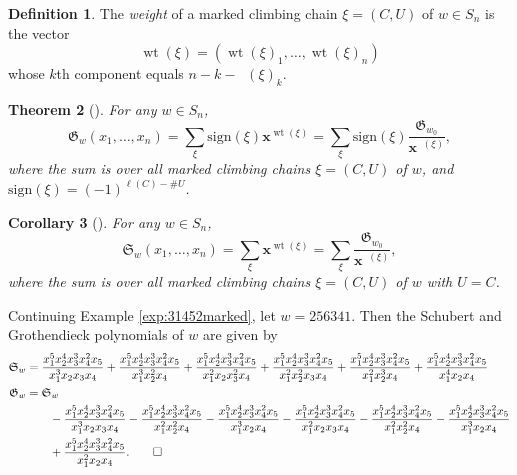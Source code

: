 \documentclass[11pt]{amsart}
\newtheorem{theorem}{Theorem}[section]
\newtheorem{corollary}[theorem]{Corollary}
\theoremstyle{definition}
\newtheorem{definition}[theorem]{Definition}
\newenvironment{example}
{\pushQED{\qed}\renewcommand{\qedsymbol}{$\diamondsuit$}\examplex}
{\popQED\endexamplex}
\theoremstyle{named}
\DeclareMathOperator{\wt}{\mathrm{wt}}
\DeclareMathOperator{\dwt}{\overline{\mathrm{wt}}}
\begin{document}
	\begin{definition}
		The \emph{weight} of a marked climbing chain $\xi=(C,U)$ of $w\in S_n$ is the vector \[\wt(\xi)=(\wt(\xi)_1,\ldots,\wt(\xi)_n)\] whose $k$th component equals $n-k-\dwt(\xi)_k$.
	\end{definition}
	
	\begin{theorem}[{\cite[Theorem 5.6]{LRS}}]
		\label{thm:grothformula}
		For any $w\in S_n$,
		\[\mathfrak{G}_w(x_1,\ldots,x_n) = \sum_{\xi} \mathrm{sign}(\xi) \bm{x}^{\wt(\xi)} =\sum_{\xi} \mathrm{sign}(\xi) \frac{\mathfrak{G}_{w_0}}{\bm{x}^{\dwt(\xi)}}, \]
		where the sum is over all marked climbing chains $\xi=(C,U)$ of $w$, and $\mathrm{sign}(\xi) = (-1)^{\ell(C)-\#U}$.
	\end{theorem}
	
	\begin{corollary}[\cite{LRS}]
		For any $w\in S_n$,
		\[\mathfrak{S}_w(x_1,\ldots,x_n) = \sum_{\xi} \bm{x}^{\wt(\xi)} = \sum_{\xi} \frac{\mathfrak{G}_{w_0}}{\bm{x}^{\dwt(\xi)}}, \]
		where the sum is over all marked climbing chains $\xi=(C,U)$ of $w$ with $U=C$.
	\end{corollary}

	\begin{example}
		\label{exp:31452polys}
		Continuing Example \ref{exp:31452marked}, let $w=256341$. Then the Schubert and Grothendieck polynomials of $w$ are given by
		\begin{align*}
			\mathfrak{S}_w &=\frac{x_1^5x_2^4x_3^3x_4^2x_5}{x_1^3x_2x_3x_4}+
							 \frac{x_1^5x_2^4x_3^3x_4^2x_5}{x_1^3x_2^2x_4}+
							 \frac{x_1^5x_2^4x_3^3x_4^2x_5}{x_1^2x_2x_3^2x_4}+
							 \frac{x_1^5x_2^4x_3^3x_4^2x_5}{x_1^2x_2^2x_3x_4}+
							 \frac{x_1^5x_2^4x_3^3x_4^2x_5}{x_1^2x_2^3x_4}+
							 \frac{x_1^5x_2^4x_3^3x_4^2x_5}{x_1^4x_2x_4}\\
			\mathfrak{G}_w &= \mathfrak{S}_w\\
			&\qquad-\frac{x_1^5x_2^4x_3^3x_4^2x_5}{x_1^3x_2x_3x_4}-
					\frac{x_1^5x_2^4x_3^3x_4^2x_5}{x_1^2x_2^2x_4}-
					\frac{x_1^5x_2^4x_3^3x_4^2x_5}{x_1^3x_2x_4}-
					\frac{x_1^5x_2^4x_3^3x_4^2x_5}{x_1^2x_2x_3x_4}-
					\frac{x_1^5x_2^4x_3^3x_4^2x_5}{x_1^2x_2^2x_4}-
					\frac{x_1^5x_2^4x_3^3x_4^2x_5}{x_1^3x_2x_4}
			\\&\qquad+\frac{x_1^5x_2^4x_3^3x_4^2x_5}{x_1^2x_2x_4}.\qedhere
		\end{align*}
	\end{example}
\end{document}
